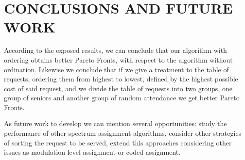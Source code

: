 
\chapter{CONCLUSIONS AND FUTURE WORK }

According to the exposed results, we can conclude that our algorithm
with ordering obtains better Pareto Fronts, with respect to the algorithm
without ordination. Likewise we conclude that if we give a treatment
to the table of requests, ordering them from highest to lowest, defined
by the highest possible cost of said request, and we divide the table
of requests into two groups, one group of seniors and another group
of random attendance we get better Pareto Fronts. 

As future work to develop we can mention several opportunities: study
the performance of other spectrum assignment algorithms, consider
other strategies of sorting the request to be served, extend this
approaches considering other issues as modulation level assignment
or coded assignment. 

